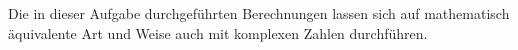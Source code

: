 \begin{diskussion}
Die in dieser Aufgabe durchgeführten Berechnungen lassen sich auf
mathematisch äquivalente Art und Weise auch mit komplexen Zahlen durchführen.
\end{diskussion}

